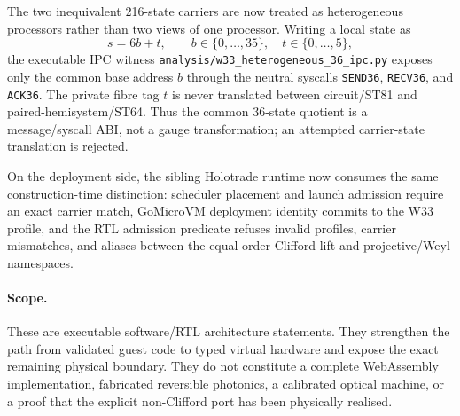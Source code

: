 The two inequivalent 216-state carriers are now treated as heterogeneous
processors rather than two views of one processor.  Writing a local state as
\[
  s=6b+t,\qquad b\in\{0,\ldots,35\},\quad t\in\{0,\ldots,5\},
\]
the executable IPC witness \texttt{analysis/w33\_heterogeneous\_36\_ipc.py}
exposes only the common base address \(b\) through the neutral syscalls
\texttt{SEND36}, \texttt{RECV36}, and \texttt{ACK36}.  The private fibre tag
\(t\) is never translated between circuit/ST81 and paired-hemisystem/ST64.
Thus the common 36-state quotient is a message/syscall ABI, not a gauge
transformation; an attempted carrier-state translation is rejected.

On the deployment side, the sibling Holotrade runtime now consumes the same
construction-time distinction: scheduler placement and launch admission require
an exact carrier match, GoMicroVM deployment identity commits to the W33
profile, and the RTL admission predicate refuses invalid profiles, carrier
mismatches, and aliases between the equal-order Clifford-lift and
projective/Weyl namespaces.

\paragraph{Scope.}
These are executable software/RTL architecture statements.  They strengthen the
path from validated guest code to typed virtual hardware and expose the exact
remaining physical boundary.  They do not constitute a complete WebAssembly
implementation, fabricated reversible photonics, a calibrated optical machine,
or a proof that the explicit non-Clifford port has been physically realised.
